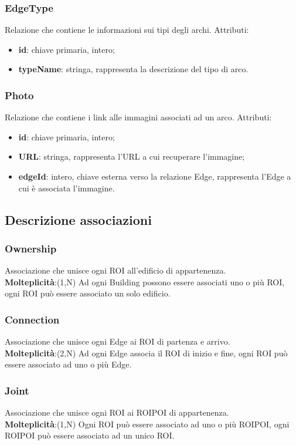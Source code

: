 \documentclass[../ManualeSviluppatore.tex]{subfiles}
\begin{document}
		\subsubsection{EdgeType}
		Relazione che contiene le informazioni sui tipi degli archi. Attributi:
			\begin{itemize}
			\item \textbf{id}: chiave primaria, intero;
			\item \textbf{typeName}: stringa, rappresenta la descrizione del tipo di arco.
			\end{itemize}
		\subsubsection{Photo}
		Relazione che contiene i link alle immagini associati ad un arco. Attributi:
			\begin{itemize}
			\item \textbf{id}: chiave primaria, intero;
			\item \textbf{URL}: stringa, rappresenta l'URL a cui recuperare l'immagine;
			\item \textbf{edgeId}: intero, chiave esterna verso la relazione Edge, rappresenta l'Edge a cui è associata l'immagine.
			\end{itemize}
	\subsection{Descrizione associazioni}
		\subsubsection{Ownership}
			Associazione che unisce ogni ROI all'edificio di appartenenza.\\
			\textbf{Molteplicità}:(1,N) Ad ogni Building possono essere associati uno o più ROI, ogni ROI può essere associato un solo edificio.

		\subsubsection{Connection}
			Associazione che unisce ogni Edge ai ROI di partenza e arrivo. \\
			\textbf{Molteplicità}:(2,N) Ad ogni Edge associa il ROI di inizio e fine, ogni ROI può essere associato ad uno o più Edge.

		\subsubsection{Joint}
			Associazione che unisce ogni ROI ai ROIPOI di appartenenza. \\
			\textbf{Molteplicità}:(1,N) Ogni ROI può essere associato ad uno o più ROIPOI, ogni ROIPOI può essere associato ad un unico ROI.
\end{document}
